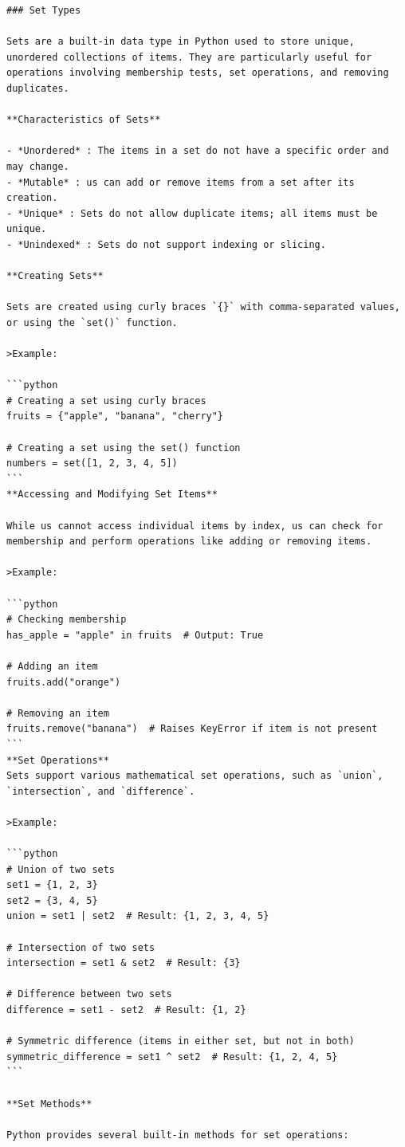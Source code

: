 \documentclass[
  letterpaper,
  DIV=11,
  numbers=noendperiod]{scrreprt}
\theoremstyle{plain}
\theoremstyle{definition}
\theoremstyle{remark}
\begin{document}
\begin{verbatim}
### Set Types

Sets are a built-in data type in Python used to store unique, unordered collections of items. They are particularly useful for operations involving membership tests, set operations, and removing duplicates.

**Characteristics of Sets**

- *Unordered* : The items in a set do not have a specific order and may change.
- *Mutable* : us can add or remove items from a set after its creation.
- *Unique* : Sets do not allow duplicate items; all items must be unique.
- *Unindexed* : Sets do not support indexing or slicing.

**Creating Sets**

Sets are created using curly braces `{}` with comma-separated values, or using the `set()` function.

>Example:

```python
# Creating a set using curly braces
fruits = {"apple", "banana", "cherry"}

# Creating a set using the set() function
numbers = set([1, 2, 3, 4, 5])
```
**Accessing and Modifying Set Items**

While us cannot access individual items by index, us can check for membership and perform operations like adding or removing items.

>Example:

```python
# Checking membership
has_apple = "apple" in fruits  # Output: True

# Adding an item
fruits.add("orange")

# Removing an item
fruits.remove("banana")  # Raises KeyError if item is not present
```
**Set Operations**
Sets support various mathematical set operations, such as `union`, `intersection`, and `difference`.

>Example:

```python
# Union of two sets
set1 = {1, 2, 3}
set2 = {3, 4, 5}
union = set1 | set2  # Result: {1, 2, 3, 4, 5}

# Intersection of two sets
intersection = set1 & set2  # Result: {3}

# Difference between two sets
difference = set1 - set2  # Result: {1, 2}

# Symmetric difference (items in either set, but not in both)
symmetric_difference = set1 ^ set2  # Result: {1, 2, 4, 5}
```

**Set Methods**

Python provides several built-in methods for set operations:


\end{verbatim}
\end{document}
